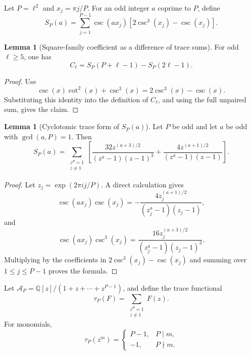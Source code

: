 \documentclass{article}
\theoremstyle{definition}
\newtheorem{lemma}[theorem]{Lemma}
\numberwithin{equation}{section}
\begin{document}
Let $P=\ell^2$ and $x_j=\pi j/P$.  For an odd integer $a$ coprime to $P$, define
\begin{equation}
S_P(a)=\sum_{j=1}^{P-1}\csc(ax_j)\left[2\csc^3(x_j)-\csc(x_j)\right].
\end{equation}

\begin{lemma}[Square-family coefficient as a difference of trace sums]
\label{lem:Cell-as-SP-difference}
For odd $\ell\geq 5$, one has
\begin{equation}
C_\ell=S_P(P+\ell-1)-S_P(2\ell-1).
\end{equation}
\end{lemma}

\begin{proof}
Use
\begin{equation}
\csc(x)\cot^2(x)+\csc^3(x)=2\csc^3(x)-\csc(x).
\end{equation}
Substituting this identity into the definition of $C_\ell$, and using the full unpaired sum, gives the claim.
\end{proof}

\begin{lemma}[Cyclotomic trace form of $S_P(a)$]
\label{lem:SP-cyclotomic-trace}
Let $P$ be odd and let $a$ be odd with $\gcd(a,P)=1$.  Then
\begin{equation}
S_P(a)=\sum_{\substack{z^P=1\\ z\neq1}}\left[\frac{32z^{(a+3)/2}}{(z^a-1)(z-1)^3}+\frac{4z^{(a+1)/2}}{(z^a-1)(z-1)}\right].
\end{equation}
\end{lemma}

\begin{proof}
Let $z_j=\exp(2\pi ij/P)$.  A direct calculation gives
\begin{equation}
\csc(ax_j)\csc(x_j)=-\frac{4z_j^{(a+1)/2}}{(z_j^a-1)(z_j-1)},
\end{equation}
and
\begin{equation}
\csc(ax_j)\csc^3(x_j)=\frac{16z_j^{(a+3)/2}}{(z_j^a-1)(z_j-1)^3}.
\end{equation}
Multiplying by the coefficients in $2\csc^3(x_j)-\csc(x_j)$ and summing over $1\leq j\leq P-1$ proves the formula.
\end{proof}

Let $\mathcal A_P=\mathbb Q[z]/(1+z+\cdots+z^{P-1})$, and define the trace functional
\begin{equation}
\tau_P(F)=\sum_{\substack{z^P=1\\ z\neq1}}F(z).
\end{equation}
For monomials,
\begin{equation}
\tau_P(z^m)=
\begin{cases}
P-1, & P\mid m,\\
-1, & P\nmid m.
\end{cases}
\end{equation}
\end{document}
